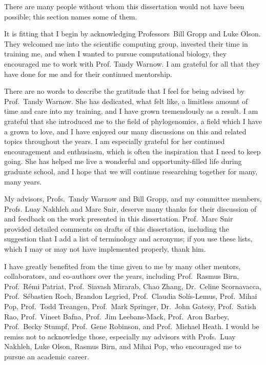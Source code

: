 \documentclass[tocnosub, noragright, centerchapter, fullpagesingle, 12pt]{uiuc_csthesis18}
\numberwithin{algocf}{chapter}
\theoremstyle{definition}
\begin{document}
%

%
\begin{acknowledgments}
There are many people without whom this dissertation would not have been possible; this section names some of them.

It is fitting that I begin by acknowledging Professors~Bill Gropp and Luke Olson. 
They welcomed me into the scientific computing group, invested their time in training me, and when I wanted to pursue computational biology, they encouraged me to work with Prof. Tandy Warnow. 
I am grateful for all that they have done for me and for their continued mentorship.

There are no words to describe the gratitude that I feel for being advised by Prof.~Tandy Warnow. 
She has dedicated, what felt like, a limitless amount of time and care into my training, and I have grown tremendously as a result.
I am grateful that she introduced me to the field of phylogenomics, a field which I have a grown to love, and I have enjoyed our many discussions on this and related topics throughout the years. 
I am especially grateful for her continued encouragement and enthusiasm, which is often the inspiration that I need to keep going.
She has helped me live a wonderful and opportunity-filled life during graduate school, and I hope that we will continue researching together for many, many years.

My advisors, Profs.~Tandy Warnow and Bill Gropp, and my committee members, Profs. Luay Nakhleh and Marc Snir, deserve many thanks for their discussion of and feedback on the work presented in this dissertation. Prof.~Marc Snir provided detailed comments on drafts of this dissertation, including the suggestion that I add a list of terminology and acronyms; if you use these lists, which I may or may not have implemented properly, thank him.

I have greatly benefited from the time given to me by many other mentors, collaborators, and co-authors over the years, including Prof.~Rasmus Birn, Prof.~R{\'e}mi Patriat, Prof.~Siavash Mirarab, Chao Zhang, Dr.~Celine Scornavacca, Prof.~S{\'e}bastien Roch, Brandon Legried, Prof.~Claudia Sol{\'i}s-Lemus, Prof.~Mihai Pop, Prof.~Todd Treangen, Prof.~Mark Springer, Dr.~John Gatesy, Prof.~Satish Rao, Prof.~Vineet Bafna, Prof.~Jim Leebans-Mack, Prof.~Aron Barbey, Prof.~Becky Stumpf, Prof.~Gene Robinson, and Prof.~Michael Heath.
I would be remiss not to acknowledge those, especially my advisors with Profs.~Luay Nakhleh, Luke Olson, Rasmus Birn, and Mihai Pop, who encouraged me to pursue an academic career.


\end{acknowledgments}
\end{document}

